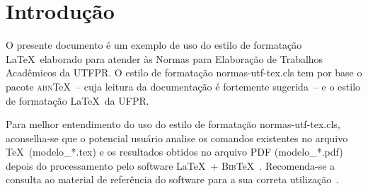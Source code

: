 \chapter{Introdu\c{c}\~ao}
\label{chap:intro}

O presente documento \'e um exemplo de uso do estilo de formata\c{c}\~ao \LaTeX\ elaborado para atender \`as Normas para Elabora\c{c}\~ao de Trabalhos Acad\^emicos da UTFPR. O estilo de formata\c{c}\~ao {\ttfamily normas-utf-tex.cls} tem por base o pacote \textsc{abn}\TeX~-- cuja leitura da documenta\c{c}\~ao \cite{abnTeX2009} \'e fortemente sugerida~-- e o estilo de formata\c{c}\~ao \LaTeX\ da UFPR.

Para melhor entendimento do uso do estilo de formata\c{c}\~ao {\ttfamily normas-utf-tex.cls}, aconselha-se que o potencial usu\'ario analise os comandos existentes no arquivo \TeX\ ({\ttfamily modelo\_*.tex}) e os resultados obtidos no arquivo PDF ({\ttfamily modelo\_*.pdf}) depois do processamento pelo software \LaTeX\ + \textsc{Bib}\TeX~\cite{LaTeX2009,BibTeX2009}. Recomenda-se a consulta ao material de refer\^encia do software para a sua correta utiliza\c{c}\~ao~\cite{Lamport1986,Buerger1989,Kopka2003,Mittelbach2004}.

